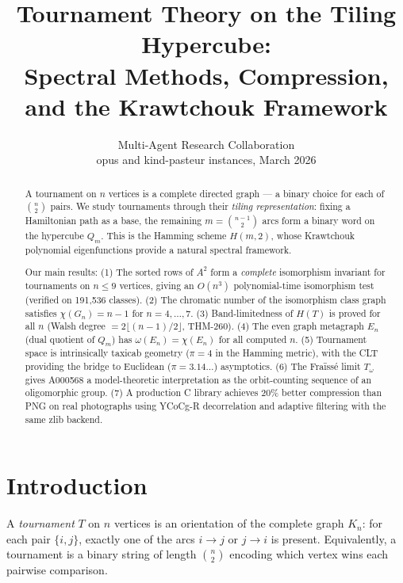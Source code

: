\documentclass[11pt,a4paper]{article}
\title{Tournament Theory on the Tiling Hypercube:\\
Spectral Methods, Compression, and the Krawtchouk Framework}
\author{Multi-Agent Research Collaboration\\
\small opus and kind-pasteur instances, March 2026}
\date{}
\theoremstyle{definition}
\theoremstyle{remark}
\begin{document}
\maketitle

\begin{abstract}
A tournament on $n$ vertices is a complete directed graph --- a binary choice for each of $\binom{n}{2}$ pairs. We study tournaments through their \emph{tiling representation}: fixing a Hamiltonian path as a base, the remaining $m = \binom{n-1}{2}$ arcs form a binary word on the hypercube $Q_m$. This is the Hamming scheme $H(m, 2)$, whose Krawtchouk polynomial eigenfunctions provide a natural spectral framework.

Our main results: (1) The sorted rows of $A^2$ form a \emph{complete} isomorphism invariant for tournaments on $n \leq 9$ vertices, giving an $O(n^3)$ polynomial-time isomorphism test (verified on 191,536 classes). (2) The chromatic number of the isomorphism class graph satisfies $\chi(G_n) = n-1$ for $n = 4, \ldots, 7$. (3) Band-limitedness of $H(T)$ is proved for all $n$ (Walsh degree $= 2\lfloor(n-1)/2\rfloor$, THM-260). (4) The even graph metagraph $E_n$ (dual quotient of $Q_m$) has $\omega(E_n) = \chi(E_n)$ for all computed $n$. (5) Tournament space is intrinsically taxicab geometry ($\pi = 4$ in the Hamming metric), with the CLT providing the bridge to Euclidean ($\pi = 3.14\ldots$) asymptotics. (6) The Fra\"iss\'e limit $T_\omega$ gives A000568 a model-theoretic interpretation as the orbit-counting sequence of an oligomorphic group. (7) A production C library achieves 20\% better compression than PNG on real photographs using YCoCg-R decorrelation and adaptive filtering with the same zlib backend.
\end{abstract}

\tableofcontents

\section{Introduction}
\label{sec:intro}

A \emph{tournament} $T$ on $n$ vertices is an orientation of the complete graph $K_n$: for each pair $\{i, j\}$, exactly one of the arcs $i \to j$ or $j \to i$ is present. Equivalently, a tournament is a binary string of length $\binom{n}{2}$ encoding which vertex wins each pairwise comparison.
\end{document}
